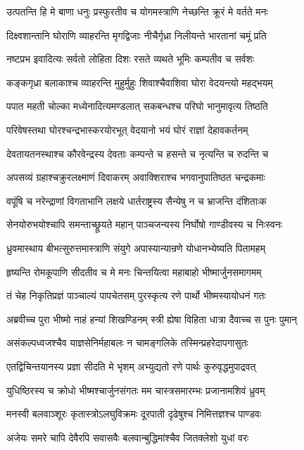 \twolineshloka
{उत्पतन्ति हि मे बाणा धनुः प्रस्फुरतीव च}
{योगमस्त्राणि नेच्छन्ति क्रूरं मे वर्तते मनः}


\twolineshloka
{दिक्ष्वशान्तानि घोराणि व्याहरन्ति मृगद्विजाः}
{नीचैर्गृध्रा निलीयन्ते भारतानां चमूं प्रति}


\twolineshloka
{नष्टप्रभ इवादित्यः सर्वतो लोहिता दिशः}
{रसते व्यथते भूमिः कम्पतीव च सर्वशः}


\twolineshloka
{कङ्कगृध्रा बलाकाश्च व्याहरन्ति मुहुर्मुहुः}
{शिवाश्चैवाशिवा घोरा वेदयन्त्यो महद्भयम्}


\twolineshloka
{पपात महती चोल्का मध्येनादित्यमण्डलात्}
{सकबन्धश्च परिघो भानुमावृत्य तिष्ठति}


\twolineshloka
{परिवेषस्तथा घोरश्चन्द्रभास्करयोरभूत्}
{वेदयानो भयं घोरं राज्ञां देहावकर्तनम्}


\twolineshloka
{देवतायतनस्थाश्च कौरवेन्द्रस्य देवताः}
{कम्पन्ते च हसन्ते च नृत्यन्ति च रुदन्ति च}


\twolineshloka
{अपसव्यं ग्रहाश्चक्रुरलक्ष्माणं दिवाकरम्}
{अवाक्शिराश्च भगवानुपातिष्ठत चन्द्रकमाः}


\twolineshloka
{वपूंषि च नरेन्द्राणां विगताभानि लक्षये}
{धार्तराष्ट्रस्य सैन्येषु न च भ्राजन्ति दंशिताःक}


\twolineshloka
{सेनयोरुभयोश्चापि समन्ताच्छ्रूयते महान्}
{पाञ्चजन्यस्य निर्घोषो गाण्डीवस्य च निःस्वनः}


\twolineshloka
{ध्रुवमास्थाय बीभत्सुरुत्तमास्त्राणि संयुगे}
{अपास्यान्यान्रणे योधानभ्येष्यति पितामहम्}


\twolineshloka
{हृष्यन्ति रोमकूपाणि सीदतीव च मे मनः}
{चिन्तयित्वा महाबाहो भीष्मार्जुनसमागमम्}


\twolineshloka
{तं चेह निकृतिप्रज्ञं पाञ्चाल्यं पापचेतसम्}
{पुरस्कृत्य रणे पार्थो भीष्मस्यायोधनं गतः}


\twolineshloka
{अब्रवीच्च पुरा भीष्मो नाहं हन्यां शिखण्डिनम्}
{स्त्री ह्येषा विहिता धात्रा दैवाच्च स पुनः पुमान्}


\twolineshloka
{असंकल्पध्वजश्चैव याज्ञसेनिर्महाबलः}
{न चामङ्गलिके तस्मिन्प्रहरेदापगासुतः}


\twolineshloka
{एतद्विचिन्तयानस्य प्रज्ञा सीदति मे भृशम्}
{अभ्युद्यतो रणे पार्थः कुरुवृद्धमुपाद्रवत्}


\twolineshloka
{युधिष्ठिरस्य च क्रोधो भीष्मश्चार्जुनसंगतः}
{मम चास्त्रसमारम्भः प्रजानामशिवं ध्रुवम्}


\twolineshloka
{मनस्वी बलवाञ्शूरः कृतास्त्रोऽलघुविक्रमः}
{दूरपाती दृढेषुश्च निमित्तज्ञश्च पाण्डवः}


\twolineshloka
{अजेयः समरे चापि देवैरपि सवासवैः}
{बलवान्बुद्धिमांश्चैव जितक्लेशो युधां वरः}


